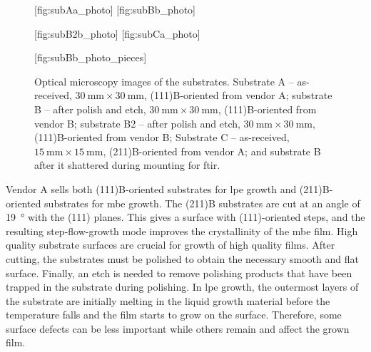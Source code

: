 \begin{figure}[htbp]
    \centering
    [fig:subAa_photo]
    \hfill
    [fig:subBb_photo]
    \par\bigskip
    [fig:subB2b_photo]
    \hfill
    [fig:subCa_photo]
    \par\bigskip
    [fig:subBb_photo_pieces]
    \caption[Optical microscopy images of the substrates.]{Optical microscopy images of the substrates.  Substrate A -- as-received, $\SI{30}{\milli\metre}\times\SI{30}{\milli\metre}$, (111)B-oriented from vendor A;  substrate B -- after polish and etch, $\SI{30}{\milli\metre}\times\SI{30}{\milli\metre}$, (111)B-oriented from vendor B;  substrate B2 -- after polish and etch, $\SI{30}{\milli\metre}\times\SI{30}{\milli\metre}$, (111)B-oriented from vendor B;  Substrate C -- as-received, $\SI{15}{\milli\metre}\times\SI{15}{\milli\metre}$, (211)B-oriented from vendor A; and  substrate B after it shattered during mounting for \ac{ftir}.}
    \label{fig:substrateABC}
\end{figure}

Vendor A sells both (111)B-oriented substrates for \ac{lpe} growth and (211)B-oriented substrates for \ac{mbe} growth. The (211)B substrates are cut at an angle of \SI{19}{\degree} with the (111) planes. This gives a surface with (111)-oriented steps, and the resulting step-flow-growth mode improves the crystallinity of the \ac{mbe} film. High quality substrate surfaces are crucial for growth of high quality films. After cutting, the substrates must be polished to obtain the necessary smooth and flat surface. Finally, an etch is needed to remove polishing products that have been trapped in the substrate during polishing. In \ac{lpe} growth, the outermost layers of the substrate are initially melting in the liquid growth material before the temperature falls and the film starts to grow on the surface. Therefore, some surface defects can be less important while others remain and affect the grown film.

%

